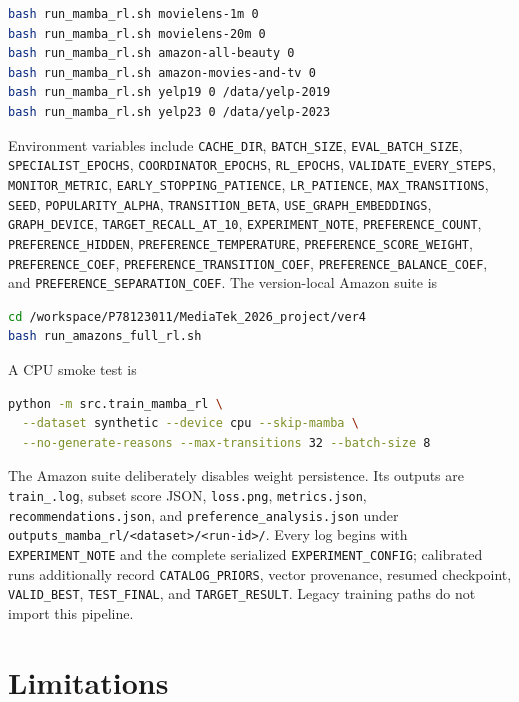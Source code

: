 \documentclass[11pt,a4paper]{article}
\begin{document}
\begin{lstlisting}[language=bash]
bash run_mamba_rl.sh movielens-1m 0
bash run_mamba_rl.sh movielens-20m 0
bash run_mamba_rl.sh amazon-all-beauty 0
bash run_mamba_rl.sh amazon-movies-and-tv 0
bash run_mamba_rl.sh yelp19 0 /data/yelp-2019
bash run_mamba_rl.sh yelp23 0 /data/yelp-2023
\end{lstlisting}

Environment variables include \texttt{CACHE\_DIR},
\texttt{BATCH\_SIZE}, \texttt{EVAL\_BATCH\_SIZE},
\texttt{SPECIALIST\_EPOCHS}, \texttt{COORDINATOR\_EPOCHS},
\texttt{RL\_EPOCHS}, \texttt{VALIDATE\_EVERY\_STEPS},
\texttt{MONITOR\_METRIC}, \texttt{EARLY\_STOPPING\_PATIENCE},
\texttt{LR\_PATIENCE}, \texttt{MAX\_TRANSITIONS}, \texttt{SEED},
\texttt{POPULARITY\_ALPHA}, \texttt{TRANSITION\_BETA},
\texttt{USE\_GRAPH\_EMBEDDINGS}, \texttt{GRAPH\_DEVICE},
\texttt{TARGET\_RECALL\_AT\_10}, \texttt{EXPERIMENT\_NOTE},
\texttt{PREFERENCE\_COUNT}, \texttt{PREFERENCE\_HIDDEN},
\texttt{PREFERENCE\_TEMPERATURE}, \texttt{PREFERENCE\_SCORE\_WEIGHT},
\texttt{PREFERENCE\_COEF}, \texttt{PREFERENCE\_TRANSITION\_COEF},
\texttt{PREFERENCE\_BALANCE\_COEF}, and
\texttt{PREFERENCE\_SEPARATION\_COEF}. The version-local Amazon suite is
\begin{lstlisting}[language=bash]
cd /workspace/P78123011/MediaTek_2026_project/ver4
bash run_amazons_full_rl.sh
\end{lstlisting}
A CPU smoke test is
\begin{lstlisting}[language=bash]
python -m src.train_mamba_rl \
  --dataset synthetic --device cpu --skip-mamba \
  --no-generate-reasons --max-transitions 32 --batch-size 8
\end{lstlisting}

The Amazon suite deliberately disables weight persistence. Its outputs are
\texttt{train\_<run-id>.log}, subset score JSON, \texttt{loss.png},
\texttt{metrics.json}, \texttt{recommendations.json}, and
\texttt{preference\_analysis.json} under
\texttt{outputs\_mamba\_rl/<dataset>/<run-id>/}. Every log begins with
\texttt{EXPERIMENT\_NOTE} and the complete serialized
\texttt{EXPERIMENT\_CONFIG}; calibrated runs additionally record
\texttt{CATALOG\_PRIORS}, vector provenance, resumed checkpoint,
\texttt{VALID\_BEST}, \texttt{TEST\_FINAL}, and
\texttt{TARGET\_RESULT}. Legacy training paths do not import this pipeline.

\section{Limitations}
\end{document}
